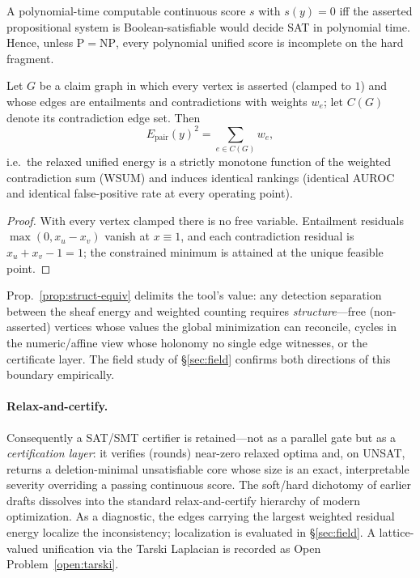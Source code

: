 \begin{proposition}
\label{prop:no-poly}
A polynomial-time computable continuous score $s$ with $s(y)=0$ iff the
asserted propositional system is Boolean-satisfiable would decide SAT in
polynomial time. Hence, unless $\mathrm P=\mathrm{NP}$, every polynomial
unified score is incomplete on the hard fragment.
\end{proposition}

\begin{proposition}
\label{prop:struct-equiv}
Let $G$ be a claim graph in which every vertex is asserted (clamped to $1$)
and whose edges are entailments and contradictions with weights $w_e$; let
$C(G)$ denote its contradiction edge set. Then
\[
E_{\mathrm{pair}}(y)^2=\sum_{e\in C(G)}w_e ,
\]
i.e.\ the relaxed unified energy is a strictly monotone function of the
weighted contradiction sum (WSUM) and induces identical rankings (identical
AUROC and identical false-positive rate at every operating point).
\end{proposition}
\begin{proof}
With every vertex clamped there is no free variable. Entailment residuals
$\max(0,x_u-x_v)$ vanish at $x\equiv 1$, and each contradiction residual is
$x_u+x_v-1=1$; the constrained minimum is attained at the unique feasible
point.
\end{proof}

\begin{remark}
\label{rem:boundary}
Prop.~\ref{prop:struct-equiv} delimits the tool's value: any detection
separation between the sheaf energy and weighted counting requires
\emph{structure}---free (non-asserted) vertices whose values the global
minimization can reconcile, cycles in the numeric/affine view whose holonomy
no single edge witnesses, or the certificate layer. The field study of
\S\ref{sec:field} confirms both directions of this boundary empirically.
\end{remark}

\paragraph{Relax-and-certify.} Consequently a SAT/SMT certifier is
retained---not as a parallel gate but as a \emph{certification layer}: it
verifies (rounds) near-zero relaxed optima and, on UNSAT, returns a
deletion-minimal unsatisfiable core whose size is an exact, interpretable
severity overriding a passing continuous score. The soft/hard dichotomy of
earlier drafts dissolves into the standard relax-and-certify hierarchy of
modern optimization. As a diagnostic, the edges carrying the largest weighted
residual energy localize the inconsistency; localization is evaluated in
\S\ref{sec:field}. A lattice-valued unification via the Tarski Laplacian
\cite{ghrist2022} is recorded as Open Problem~\ref{open:tarski}.

